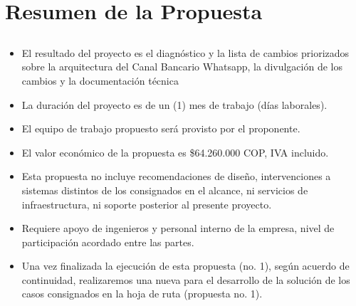 \documentclass[
  paper=a4,
  ,captions=tableheading
]{scrartcl}
\providecommand{\tightlist}{%
  \setlength{\itemsep}{0pt}\setlength{\parskip}{0pt}}
\renewenvironment{quote}{\begin{customblockquote}\list{}{\rightmargin=0em\leftmargin=0em}%
\item\relax\color{blockquote-text}\ignorespaces}{\unskip\unskip\endlist\end{customblockquote}}
\begin{document}
\newpage

\section{Resumen de la Propuesta}\label{sec:resumen-de-la-propuesta}

\subsection{}\label{sec:section}

\begin{quote}
\end{quote}

\begin{itemize}
\tightlist
\item
  El resultado del proyecto es el diagnóstico y la lista de cambios
  priorizados sobre la arquitectura del Canal Bancario Whatsapp, la
  divulgación de los cambios y la documentación técnica
\item
  La duración del proyecto es de un (1) mes de trabajo (días laborales).
\item
  El equipo de trabajo propuesto será provisto por el proponente.
\item
  El valor económico de la propuesta es \$64.260.000 COP, IVA incluido.
\item
  Esta propuesta no incluye recomendaciones de diseño, intervenciones a
  sistemas distintos de los consignados en el alcance, ni servicios de
  infraestructura, ni soporte posterior al presente proyecto.
\item
  Requiere apoyo de ingenieros y personal interno de la empresa, nivel
  de participación acordado entre las partes.
\item
  Una vez finalizada la ejecución de esta propuesta (no. 1), según
  acuerdo de continuidad, realizaremos una nueva para el desarrollo de
  la solución de los casos consignados en la hoja de ruta (propuesta no.
  1).
\end{itemize}
\end{document}
